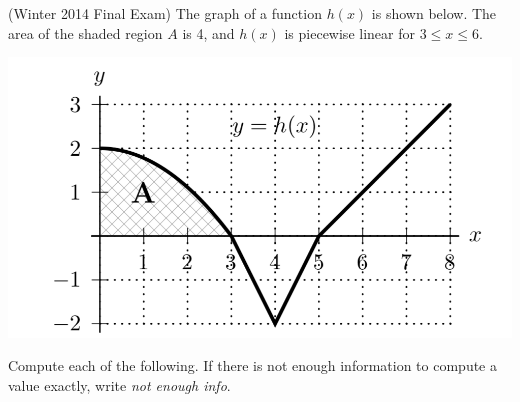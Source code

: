 \documentclass[11pt]{exam}
\begin{document}
\begin{questions}
      \question (Winter 2014 Final Exam) %
        The graph of a function $h(x)$ is shown below. The area of the shaded region $A$ is 4, and $h(x)$ is piecewise linear for $3 \leqslant x \leqslant 6$.
        \begin{center}
          \includegraphics[scale=0.5]{Figures/graph3.png}
        \end{center}
Compute each of the following. If there is not enough information to compute a value exactly, write \emph{not enough info}.

\end{questions}
\end{document}
